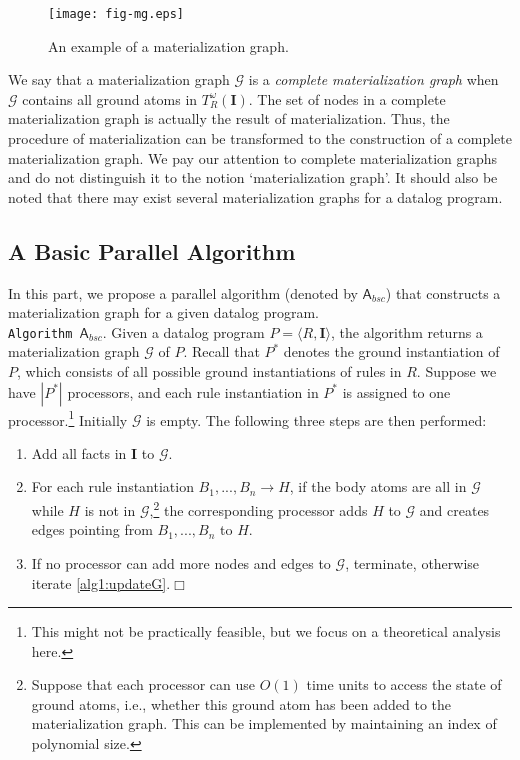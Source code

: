 \documentclass[final,1p,times]{elsarticle}
\begin{document}
\begin{figure}[htbp]
\begin{center}
\texttt{[image: fig-mg.eps]}
\caption{An example of a materialization graph.}
\label{fig:mg}
\end{center}
\end{figure}

We say that a materialization graph $\mathcal{G}$ is a \emph{complete materialization graph}
when $\mathcal{G}$ contains all ground atoms in $T_R^{\omega}(\textbf{I})$.
The set of nodes in a complete materialization graph is actually the result
of materialization.
Thus, the procedure of materialization can be transformed to the construction of
a complete materialization graph.
We pay our attention to complete materialization graphs and do not distinguish it to the
notion `materialization graph'.
It should also be noted that there may exist several materialization graphs for a datalog program.

\subsection{A Basic Parallel Algorithm}

In this part, we propose a parallel algorithm
(denoted by $\mathsf{A}_{bsc}$) that constructs a materialization graph for a given datalog program.\\

\noindent\texttt{Algorithm $\mathsf{A}_{bsc}$}. Given a datalog program $P=\langle R, \textbf{I}\rangle$,
the algorithm returns a materialization graph $\mathcal{G}$ of $P$.
Recall that $P^*$ denotes the ground instantiation of $P$,
which consists of all possible ground instantiations of rules in $R$.
Suppose we have $|P^*|$ processors, and each rule instantiation in $P^*$ is
assigned to one processor.\footnote{This might not be practically feasible,
but we focus on a theoretical analysis here.}
Initially $\mathcal{G}$ is empty. The following three steps are then performed:
\begin{enumerate}[leftmargin=8ex,label=(\textit{Step \arabic*}),ref=Step~\arabic*]
\item Add all facts in $\textbf{I}$ to $\mathcal{G}$.\label{alg1:addFacts}
\item For each rule instantiation $B_1,...,B_n\rightarrow H$, if the body atoms are all
    in $\mathcal{G}$ while $H$ is not in $\mathcal{G}$,\footnote{Suppose that each processor
    can use $O(1)$ time units to access the state of ground atoms, i.e., whether this ground
    atom has been added to the materialization graph. This can be implemented by maintaining an
    index of polynomial size.}
    the corresponding processor adds $H$ to $\mathcal{G}$ and creates edges pointing
    from $B_1,...,B_n$ to $H$.\label{alg1:updateG}
\item If no processor can add more nodes and edges to $\mathcal{G}$, terminate, otherwise iterate \ref{alg1:updateG}.\label{alg1:halt}\hfill$\Box$
\end{enumerate}
\end{document}
